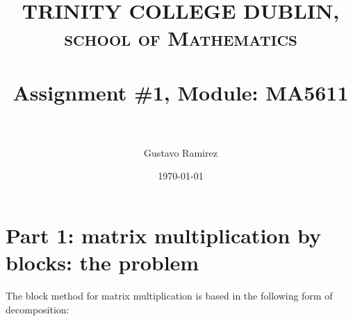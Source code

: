 \documentclass[paper=a4, fontsize=11pt]{scrartcl} %
\title{	
\normalfont \normalsize 
\textsc{TRINITY COLLEGE DUBLIN, school of Mathematics} \\ [25pt] %
\horrule{0.5pt} \\[0.4cm] %
\huge Assignment \#1, Module: MA5611 \\ %
\horrule{2pt} \\[0.5cm] %
}
\author{Gustavo Ramirez} %
\date{\normalsize\today} %
\numberwithin{equation}{section} %
\numberwithin{figure}{section} %
\numberwithin{table}{section} %
\begin{document}
\maketitle %

\newpage

\section{Part 1: matrix multiplication by blocks: the problem}

The block method for matrix multiplication is based in the following form of decomposition:
\end{document}
